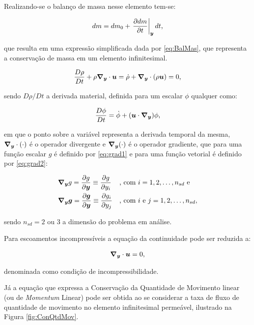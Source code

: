 Realizando-se o balanço de massa nesse elemento tem-se:

\begin{equation}
    dm=dm_0+\left.\frac{\partial{dm}}{\partial{t}}\right|_{\boldsymbol{y}}dt\text{,}
\end{equation}

\noindent que resulta em uma expressão simplificada dada por \eqref{eq:BalMas}, que representa a conservação de massa em um elemento infinitesimal.

\begin{equation}
    \frac{D\rho}{Dt}+\rho \boldsymbol{\nabla_y}\cdot\boldsymbol{u}=\dot{\rho}+\boldsymbol{\nabla_y}\cdot(\rho \boldsymbol{u})=0\text{,}
    \label{eq:BalMas}
\end{equation}

\noindent sendo $D\rho/Dt$ a derivada material, definida para um escalar $\phi$ qualquer como:

\begin{equation}
    \frac{D\phi}{Dt}=\dot{\phi}+(\boldsymbol{u}\cdot\boldsymbol{\nabla_y})\phi\text{,}
\end{equation}

\noindent em que o ponto sobre a variável representa a derivada temporal da mesma, $\boldsymbol{\nabla_y}\cdot(\cdot)$ é o operador divergente e $\boldsymbol{\nabla_y}(\cdot)$ é o operador gradiente, que para uma função escalar $g$ é definido por \eqref{eq:grad1} e para uma função vetorial é definido por \eqref{eq:grad2}:

\begin{subequations}
    \begin{align}
         & \boldsymbol{\nabla_y} g=\frac{\partial{g}}{\partial{\boldsymbol{y}}}\equiv\frac{\partial{g}}{\partial{y_i}}            &  & \text{, com }i=1,2,\hdots,n_{sd}\text{ e} \label{eq:grad1}    \\
         & \boldsymbol{\nabla_y}\boldsymbol{g}=\frac{\partial{\boldsymbol{g}}}{\partial{\boldsymbol{y}}}\equiv\frac{\partial{g_i}}{\partial{y_j}} &  & \text{, com }i\text{ e }j=1,2,\hdots,n_{sd}, \label{eq:grad2}
    \end{align}
\end{subequations}

\noindent sendo $n_{sd}=2$ ou $3$ a dimensão do problema em análise.

Para escoamentos incompressíveis a equação da continuidade pode ser reduzida a:

\begin{equation}
    \boldsymbol{\nabla_y}\cdot\boldsymbol{u}=0\text{,}\label{eq:incomp}
\end{equation}

\noindent denominada como condição de incompressibilidade.

Já a equação que expressa a Conservação da Quantidade de Movimento linear (ou de \textit{Momentum} Linear) pode ser obtida ao se considerar a taxa de fluxo de quantidade de movimento no elemento infinitesimal permeável, ilustrado na Figura \ref{fig:ConQtdMov}.

